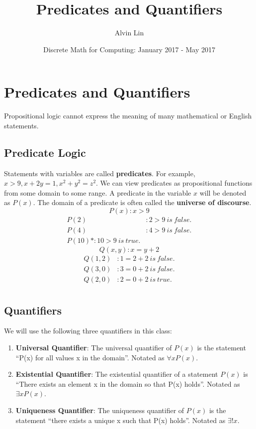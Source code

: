 \documentclass[letterpaper, 12pt]{math}
\title{Predicates and Quantifiers}
\author{Alvin Lin}
\date{Discrete Math for Computing: January 2017 - May 2017}
\begin{document}
\maketitle

\section*{Predicates and Quantifiers}
Propositional logic cannot express the meaning of many mathematical or
English statements.

\subsection*{Predicate Logic}
Statements with variables are called \textbf{predicates}. For example,
\( x > 9, x+2y = 1, x^{2}+y^{2} = z^{2} \).
We can view predicates as propositional functions from some domain to some
range. A predicate in the variable \( x \) will be denoted as \( P(x) \). The
domain of a predicate is often called the \textbf{universe of discourse}.
\[ P(x): x > 9 \]
\begin{align*}
  P(2)&: 2 > 9\ is\ false. \\
  P(4)&: 4 > 9\ is\ false. \\
  P(10)*: 10 > 9\ is\ true.
\end{align*}
\[ Q(x,y): x = y+2 \]
\begin{align*}
  Q(1,2)&: 1 = 2+2\ is\ false. \\
  Q(3,0)&: 3 = 0+2\ is\ false. \\
  Q(2,0)&: 2 = 0+2\ is\ true. \\
\end{align*}

\subsection*{Quantifiers}
We will use the following three quantifiers in this class:
\begin{enumerate}
  \item \textbf{Universal Quantifier}: The universal quantifier of \( P(x) \)
    is the statement ``P(x) for all values x in the domain''. Notated as
    \( \forall{x}P(x) \).
  \item \textbf{Existential Quantifier}: The existential quantifier of a
    statement \( P(x) \) is ``There exists an element x in the domain so
    that P(x) holds''. Notated as
    \( \exists{x}P(x) \).
  \item \textbf{Uniqueness Quantifier}: The uniqueness quantifier of \( P(x) \)
    is the statement ``there exists a unique x such that P(x) holds''. Notated
    as \( \exists{!x} \).
\end{enumerate}
\end{document}

